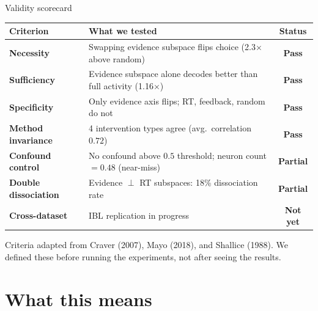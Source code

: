 \documentclass[aspectratio=169,11pt]{beamer}
\begin{document}
\begin{frame}{Validity scorecard}
{\small
\begin{tabular}{lp{6.5cm}c}
\toprule
\textbf{Criterion} & \textbf{What we tested} & \textbf{Status} \\
\midrule
\textbf{Necessity} & Swapping evidence subspace flips choice (2.3$\times$ above random) & \textcolor{pass}{\textbf{Pass}} \\
\textbf{Sufficiency} & Evidence subspace alone decodes better than full activity (1.16$\times$) & \textcolor{pass}{\textbf{Pass}} \\
\textbf{Specificity} & Only evidence axis flips; RT, feedback, random do not & \textcolor{pass}{\textbf{Pass}} \\
\textbf{Method invariance} & 4 intervention types agree (avg.\ correlation $0.72$) & \textcolor{pass}{\textbf{Pass}} \\
\textbf{Confound control} & No confound above $0.5$ threshold; neuron count $= 0.48$ (near-miss) & \textcolor{partial}{\textbf{Partial}} \\
\textbf{Double dissociation} & Evidence $\perp$ RT subspaces: 18\% dissociation rate & \textcolor{partial}{\textbf{Partial}} \\
\textbf{Cross-dataset} & IBL replication in progress & \textcolor{fail}{\textbf{Not yet}} \\
\bottomrule
\end{tabular}
}

\vspace{0.6em}
{\small Criteria adapted from Craver (2007), Mayo (2018), and Shallice (1988). We defined these before running the experiments, not after seeing the results.}
\end{frame}

\section{What this means}
\end{document}
